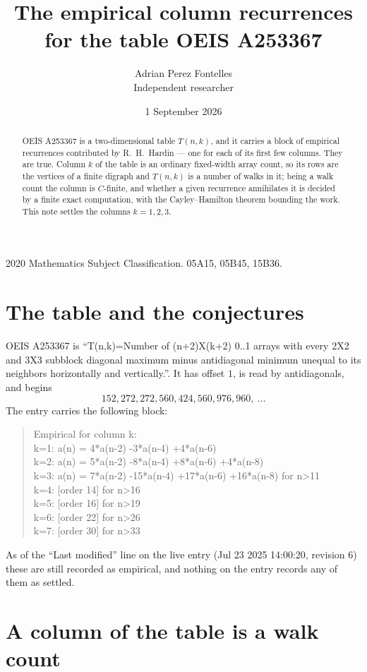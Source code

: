\documentclass[11pt,a4paper]{article}
\title{The empirical column recurrences for the table OEIS A253367}
\author{Adrian Perez Fontelles\\ \small Independent researcher}
\date{1 September 2026}
\theoremstyle{plain}
\theoremstyle{definition}
\begin{document}
\maketitle

\begin{abstract}
OEIS A253367 is a two-dimensional table $T(n,k)$, and it carries a block of empirical
recurrences contributed by R.~H.~Hardin --- one for each of its first few columns. They are
true. Column $k$ of the table is an ordinary fixed-width array count, so its rows are the
vertices of a finite digraph and $T(n,k)$ is a number of walks in it; being a walk count the
column is $C$-finite, and whether a given recurrence annihilates it is decided by a finite
exact computation, with the Cayley--Hamilton theorem bounding the work. This note settles the columns $k=1, 2, 3$.
\end{abstract}

\noindent\small 2020 Mathematics Subject Classification. 05A15, 05B45, 15B36.\normalsize

\section{The table and the conjectures}

OEIS A253367 is ``T(n,k)=Number of (n+2)X(k+2) 0..1 arrays with every 2X2 and 3X3 subblock diagonal maximum minus antidiagonal minimum unequal to its neighbors horizontally and vertically.''. It has offset $1$, is
read by antidiagonals, and begins
\[
152, 272, 272, 560, 424, 560, 976, 960,\ \dots
\]
The entry carries the following block:
\begin{quote}\small
Empirical for column k:\\
k=1: a(n) = 4*a(n-2) -3*a(n-4) +4*a(n-6)\\
k=2: a(n) = 5*a(n-2) -8*a(n-4) +8*a(n-6) +4*a(n-8)\\
k=3: a(n) = 7*a(n-2) -15*a(n-4) +17*a(n-6) +16*a(n-8) for n>11\\
k=4: [order 14] for n>16\\
k=5: [order 16] for n>19\\
k=6: [order 22] for n>26\\
k=7: [order 30] for n>33\\
\end{quote}
As of the ``Last modified'' line on the live entry (Jul 23 2025 14:00:20, revision 6) these are still
recorded as empirical, and nothing on the entry records any of them as settled.

\section{A column of the table is a walk count}
\end{document}
